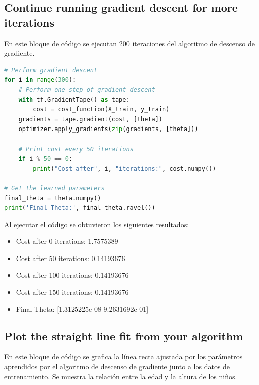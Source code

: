 \documentclass{article}
\begin{document}
    \subsection{Continue running gradient descent for more iterations}\label{ssec:Continue-Running-Gradient-Descent}
    En este bloque de código se ejecutan 200 iteraciones del algoritmo de descenso de gradiente.
    \begin{lstlisting}[language=Python, caption={Ejecución de 200 iteraciones del algoritmo de descenso de gradiente},label={lst:ContinueRunningGradientDescent}]
# Perform gradient descent
for i in range(300):
    # Perform one step of gradient descent
    with tf.GradientTape() as tape:
        cost = cost_function(X_train, y_train)
    gradients = tape.gradient(cost, [theta])
    optimizer.apply_gradients(zip(gradients, [theta]))

    # Print cost every 50 iterations
    if i % 50 == 0:
        print("Cost after", i, "iterations:", cost.numpy())

# Get the learned parameters
final_theta = theta.numpy()
print('Final Theta:', final_theta.ravel())
    \end{lstlisting}
    \noindent
    Al ejecutar el código se obtuvieron los siguientes resultados:
    \begin{itemize}
        \item Cost after 0 iterations: 1.7575389
        \item Cost after 50 iterations: 0.14193676
        \item Cost after 100 iterations: 0.14193676
        \item Cost after 150 iterations: 0.14193676
        \item Final Theta: [1.3125225e-08 9.2631692e-01]
    \end{itemize}


    \subsection{Plot the straight line fit from your algorithm}\label{ssec:Plot-Straight-Line-Fit}
    En este bloque de código se grafica la línea recta ajustada por los parámetros aprendidos por el algoritmo de descenso de gradiente
    junto a los datos de entrenamiento. Se muestra la relación entre la edad y la altura de los niños.
\end{document}
